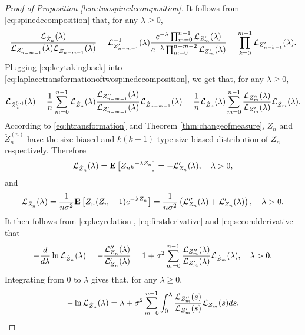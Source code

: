 \documentclass[12pt]{amsart}
\theoremstyle{remark}
\numberwithin{equation}{section}
\newcommand{\expr}[1]{\left( #1 \right)}
\newcommand{\brac}[1]{\left[ #1 \right]}
\newcommand{\expct}{\mathbf E}
\begin{document}
\medskip
\begin{proof}[Proof of Proposition \ref{lem:twospinedecomposition}]
    It follows from \eqref{eq:spinedecomposition} that,
    for any $\lambda\geq 0$,
\begin{multline}
\label{eq:keytakingback}
	    \frac{\mathcal L_{\dot Z_n}(\lambda)}{\mathcal L_{Z_{n-m-1}'}(\lambda)\mathcal L_{\dot Z_{n-m-1}}(\lambda)}
	=
	    \mathcal L_{Z_{n-m-1}'}^{-1}(\lambda)\frac{e^{-\lambda}\prod_{m=0}^{n-1}\mathcal L_{Z'_m}(\lambda)}{e^{-\lambda}\prod_{m=0}^{n-m-2}\mathcal L_{Z'_m}(\lambda)}
	=
	    \prod_{k=0}^{m-1}\mathcal L_{Z'_{n-k-1}}(\lambda).
\end{multline}
Plugging \eqref{eq:keytakingback} into 
\eqref{eq:laplacetransformationoftwospinedecomposition}, we get that, for any $\lambda\geq 0$,
\begin{equation}
\label{eq:keyrelation}
        \mathcal L_{\ddot Z_n^{(n)}}(\lambda)
	=
        \frac{1}{n}\sum_{m=0}^{n-1}\mathcal L_{\dot Z_n}(\lambda)\frac{\mathcal L_{Z''_{n-m-1}}(\lambda)}{\mathcal L_{Z_{n-m-1}'}(\lambda)}\mathcal L_{\dot Z_{n-m-1}}(\lambda)
    =
        \frac{1}{n}\mathcal L_{\dot Z_n}(\lambda)\sum_{m=0}^{n-1}\frac{\mathcal L_{Z''_m}(\lambda)}{\mathcal L_{Z'_m}(\lambda)}\mathcal L_{\dot Z_m}(\lambda).
\end{equation}
    According to \eqref{eq:htransformation} and Theorem \ref{thm:changeofmeasure}, $\dot Z_n$ and $\ddot Z_n^{(n)}$ have the size-biased and $k(k-1)$-type size-biased distribution of $Z_n$ respectively. Therefore
\begin{equation}
\label{eq:firstderivative}
        \cL_{\dot Z_n}(\lambda)
	=
	    \expct\brac{Z_n e^{-\lambda Z_n}}
	=
	    -\cL_{Z_n}'(\lambda)
  ,\quad \lambda > 0,
\end{equation}
    and
\begin{equation}
\label{eq:secondderivative}
        \cL_{\ddot Z_n}(\lambda)
	=
		\frac{1}{n\sigma^2}\expct\brac{Z_n(Z_n-1)e^{-\lambda Z_n}}
	=
		\frac{1}{n\sigma^2}\expr{\cL_{Z_n}''(\lambda)+\cL_{Z_n}'(\lambda)},
		\quad \lambda > 0.
\end{equation}
It then follows from \eqref{eq:keyrelation}, \eqref{eq:firstderivative} and \eqref{eq:secondderivative} that
\begin{equation*}
		-\frac{d}{d\lambda}\ln \mathcal L_{\dot Z_n}(\lambda)
	=
		-\frac{\mathcal L_{Z_n}''(\lambda)}{\mathcal L_{Z_n}'(\lambda)}
	=
		1+\sigma^2\sum_{m=0}^{n-1}\frac{\mathcal L_{Z''_{m}}(\lambda)}{\mathcal L_{Z'_{m}}(\lambda)}\mathcal L_{\dot Z_{m}}(\lambda),
\quad \lambda > 0.
\end{equation*}
Integrating from $0$ to $\lambda$ gives that,
for any $\lambda\geq 0$,
\begin{equation*}
		-\ln \mathcal L_{\dot Z_n}(\lambda)
	=
		\lambda
	+
		\sigma^2\sum_{m=0}^{n-1}\int_0^\lambda \frac{\mathcal L_{Z''_{m}}(s)}{\mathcal L_{Z'_{m}}(s)}\mathcal L_{Z_m}(s)ds.
\end{equation*}
\end{proof}
\end{document}
